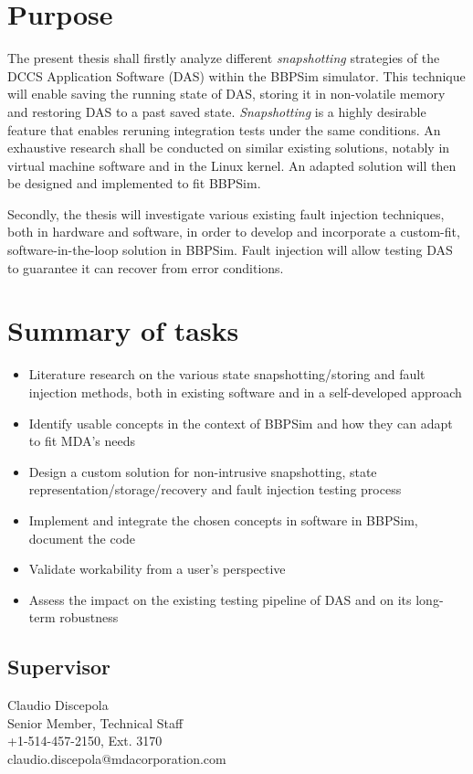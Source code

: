 \documentclass[12pt,english]{rftthesis}
\begin{document}
%
%
\section*{Purpose}\label{sec:purpose}
The present thesis shall firstly analyze different \textit{snapshotting} strategies of the DCCS Application Software (DAS) within the BBPSim simulator. This technique will enable saving the running state of DAS, storing it in non-volatile memory and restoring DAS to a past saved state. \textit{Snapshotting} is a highly desirable feature that enables reruning integration tests under the same conditions. An exhaustive research shall be conducted on similar existing solutions, notably in virtual machine software and in the Linux kernel. An adapted solution will then be designed and implemented to fit BBPSim. 

Secondly, the thesis will investigate various existing fault injection techniques, both in hardware and software, in order to develop and incorporate a custom-fit, software-in-the-loop solution in BBPSim. Fault injection will allow testing DAS to guarantee it can recover from error conditions.
%
%
\section*{Summary of tasks}\label{sec:tasks}
\begin{itemize}
\item Literature research on the various state snapshotting/storing and fault injection methods, both in existing software and in a self-developed approach
\item Identify usable concepts in the context of BBPSim and how they can adapt to fit MDA's needs 
\item Design a custom solution for non-intrusive snapshotting, state representation/storage/recovery and fault injection testing process 
\item Implement and integrate the chosen concepts in software in BBPSim, document the code
\item Validate workability from a user's perspective
\item Assess the impact on the existing testing pipeline of DAS and on its long-term robustness
\end{itemize}

\subsection*{Supervisor}
\begin{spacing}{1}
Claudio Discepola\\
Senior Member, Technical Staff\\
+1-514-457-2150, Ext. 3170\\
claudio.discepola@mdacorporation.com
\end{spacing}
\end{document}

